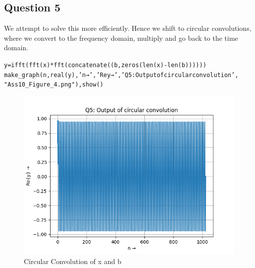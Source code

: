 \documentclass{article}
\begin{document}
\subsection{Question 5}
We attempt to solve this more efficiently. Hence we shift to circular convolutions, where we convert to the frequency domain, multiply and go back to the time domain.
\begin{alltt}
y = ifft(fft(x)*fft(concatenate((b, zeros(len(x) - len(b))))))
make_graph(n, real(y), 'n →', 'Re{y} →', 'Q5: Output of circular convolution', 
"Ass10_Figure_4.png"), show()
\end{alltt}
\begin{figure}[h!]
\centering
\includegraphics[scale=0.6]{Ass10_Figure_4.png}
\caption{Circular Convolution of x and b}
\label{fig:universe}
\end{figure}
\end{document}
